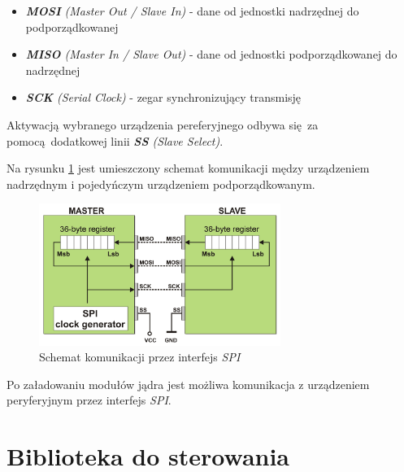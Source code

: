 \documentclass[eng,printmode]{mgr}
\begin{document}
\begin{itemize}
  \item{\emph{\textbf{MOSI} (Master Out / Slave In)} - dane od jednostki nadrzędnej do podporządkowanej}
  \item{\emph{\textbf{MISO} (Master In / Slave Out)} - dane od jednostki podporządkowanej do nadrzędnej}
  \item{\emph{\textbf{SCK} (Serial Clock)} - zegar synchronizujący transmisję}
\end{itemize}

Aktywacją wybranego urządzenia pereferyjnego odbywa się za pomocą dodatkowej linii \emph{\textbf{SS} (Slave Select)}.

Na rysunku \ref{spi} jest umieszczony schemat komunikacji mędzy urządzeniem nadrzędnym i pojedyńczym urządzeniem podporządkowanym.

\begin{figure}[!ht]
    \centering
    \includegraphics[width=0.7\textwidth]{Figures/spi3.png} 
    \caption{Schemat komunikacji przez interfejs \emph{SPI}}
    \label{spi}
\end{figure}

Po załadowaniu modułów jądra jest możliwa komunikacja z urządzeniem peryferyjnym przez interfejs \emph{SPI}.



\chapter{Biblioteka do sterowania}




\listoffigures
\end{document}
